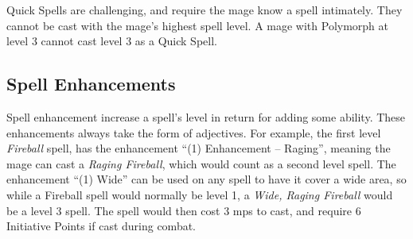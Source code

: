 \begin{multicols}{2}
Quick Spells are challenging, and require the mage know a spell intimately.  They cannot be cast with the mage's highest spell level.  A mage with Polymorph at level 3 cannot cast level 3 as a Quick Spell.

\subsection{Spell Enhancements}

Spell enhancement increase a spell's level in return for adding some ability.
These enhancements always take the form of adjectives.
For example, the first level \textit{Fireball} spell, has the enhancement ``(1) Enhancement -- Raging'', meaning the mage can cast a \textit{Raging Fireball}, which would count as a second level spell.
The enhancement ``(1) Wide'' can be used on any spell to have it cover a wide area, so while a Fireball spell would normally be level 1, a \textit{Wide, Raging Fireball} would be a level 3 spell.
The spell would then cost 3 \glspl{mp} to cast, and require 6 Initiative Points if cast during combat.

\end{multicols}

\resumecontents[magic]


